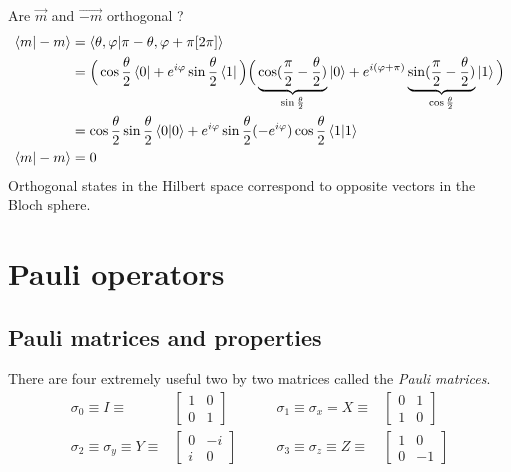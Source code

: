 \documentclass{article}
\begin{document}
Are $\vec{m}$ and $\vec{-m}$ orthogonal ?
\begin{equation}
    \label{m-m-orthogonal}
    \begin{aligned} %
        \braket{m|-m}
            & = \braket{\theta,\varphi|\pi-\theta,\varphi+\pi[2\pi]} \\
            & = \Big(\cos\frac{\theta}{2}\bra{0}+e^{i\varphi}\sin\frac{\theta}{2}\bra{1}\Big)
                \Big(\underbrace{\cos(\frac{\pi}{2}-\frac{\theta}{2})}_{\sin\frac{\theta}{2}}
                \ket{0}+e^{i(\varphi+\pi)}
                \underbrace{\sin(\frac{\pi}{2}-\frac{\theta}{2})}_{
                \cos\frac{\theta}{2}}\ket{1}\Big) \\
            & = \cos\frac{\theta}{2}\sin\frac{\theta}{2}\braket{0|0}
                +e^{i\varphi}\sin\frac{\theta}{2}(-e^{i\varphi})\cos\frac{\theta}{2}\braket{1|1} \\
        \braket{m|-m}
            & = 0
    \end{aligned}
\end{equation}
Orthogonal states in the Hilbert space correspond to opposite vectors in the Bloch sphere.


\section{Pauli operators}
\subsection{Pauli matrices and properties}
There are four extremely useful two by two matrices called the \textit{Pauli matrices}.
$$
\begin{aligned}
    \sigma_0 \equiv I \equiv &
        \begin{bmatrix}
            1 & 0 \\ 0 & 1
        \end{bmatrix}
    \quad & \quad
    \sigma_1 \equiv \sigma_x = X \equiv &
        \begin{bmatrix}
            0 & 1 \\ 1 & 0
        \end{bmatrix}
    \\
    \sigma_2 \equiv \sigma_y \equiv Y \equiv &
        \begin{bmatrix}
            0 & -i \\ i & 0
        \end{bmatrix}
    \quad & \quad
    \sigma_3 \equiv \sigma_z \equiv Z \equiv &
        \begin{bmatrix}
            1 & 0 \\ 0 & -1
        \end{bmatrix}
\end{aligned}
$$
\end{document}

